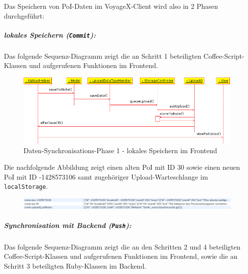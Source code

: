 Das Speichern von PoI-Daten im VoyageX-Client wird also in 2 Phasen durchgeführt:\\
\subparagraph{lokales Speichern (\texttt{Commit}):}
Das folgende Sequenz-Diagramm zeigt die an Schritt 1 beteiligten Coffee-Script-Klassen und aufgerufenen Funktionen im Frontend.
\enlargethispage{2\baselineskip} %
  \begin{figure}[H]
  	\begin{adjustwidth}{-0.3cm}{0.3cm}
      \centering
  	  \includegraphics[scale=0.7]{bilder/uml/queuePoiNote.png}
  	  \caption{Daten-Synchronisations-Phase 1 - lokales Speichern im Frontend}
  	\end{adjustwidth}
  \end{figure}
\noindent
Die nachfolgende Abbildung zeigt einen alten PoI mit ID 30 sowie einen neuen PoI mit ID -1428573106 samt zugehöriger Upload-Warteschlange im \texttt{localStorage}.
  \begin{figure}[H]
  	\begin{adjustwidth}{-0.4cm}{0.4cm}
      \centering
  	  \includegraphics[scale=0.7]{bilder/screenshots/queue_localStrorage_1.png}
  	\end{adjustwidth}
  \end{figure}
\vspace{1ex}
\subparagraph{Synchronisation mit Backend (\texttt{Push}):}
Das folgende Sequenz-Diagramm zeigt die an den Schritten 2 und 4 beteiligten Coffee-Script-Klassen und aufgerufenen Funktionen im Frontend, sowie die an Schritt 3 beteiligten Ruby-Klassen im Backend. 
